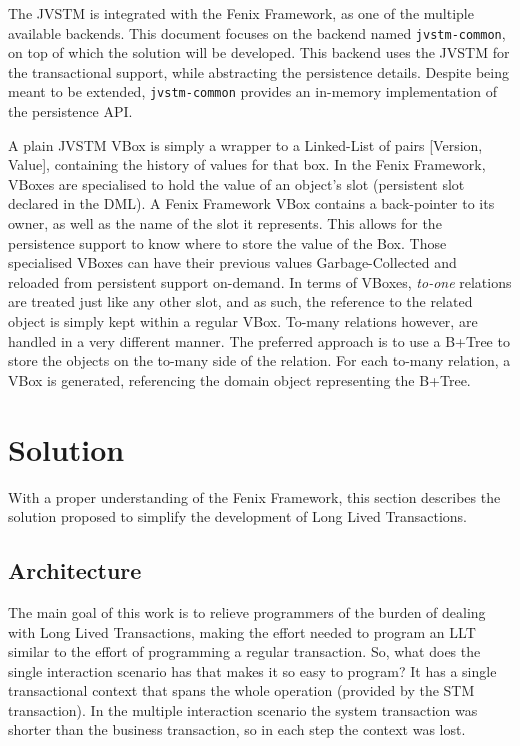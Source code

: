 \documentclass{llncs}
\begin{document}
The JVSTM is integrated with the Fenix Framework, as one of the
multiple available backends. This document focuses on the backend
named \texttt{jvstm-common}, on top of which the solution will be
developed. This backend uses the JVSTM for the transactional support,
while abstracting the persistence details. Despite being meant to be
extended, \texttt{jvstm-common} provides an in-memory implementation
of the persistence API.

A plain JVSTM VBox is simply a wrapper to a Linked-List of pairs
[Version, Value], containing the history of values for that box. In
the Fenix Framework, VBoxes are specialised to hold the value of an
object's slot (persistent slot declared in the DML). A Fenix Framework
VBox contains a back-pointer to its owner, as well as the name of the
slot it represents. This allows for the persistence support to know
where to store the value of the Box.  Those specialised VBoxes can
have their previous values Garbage-Collected and reloaded from
persistent support on-demand. In terms of VBoxes, {\it to-one}
relations are treated just like any other slot, and as such, the
reference to the related object is simply kept within a regular
VBox. To-many relations however, are handled in a very different
manner. The preferred approach is to use a B+Tree
\cite{elmasri2009fundamentals} to store the objects on the to-many
side of the relation. For each to-many relation, a VBox is generated,
referencing the domain object representing the B+Tree.


\section{Solution}
\label{chap:solution}

With a proper understanding of the Fenix Framework, this section
describes the solution proposed to simplify the development of Long
Lived Transactions.

\subsection{Architecture}
\label{sec:arch}

The main goal of this work is to relieve programmers of the burden of
dealing with Long Lived Transactions, making the effort needed to
program an LLT similar to the effort of programming a regular
transaction. So, what does the single interaction scenario has that
makes it so easy to program? It has a single transactional context
that spans the whole operation (provided by the STM transaction). In
the multiple interaction scenario the system transaction was shorter
than the business transaction, so in each step the context was lost.
\end{document}
